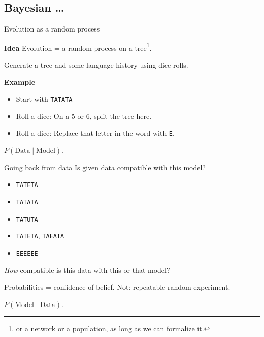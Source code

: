 \documentclass[9pt]{beamer}
\newcommand{\paragraph}[1]{\par{\bfseries #1}}
\begin{document}
\subsection{Bayesian …}
\begin{frame}{Evolution as a random process}
  \paragraph{Idea} Evolution = a random process on a tree\footnote{or a network or
    a population, as long as we can formalize it.}.

  Generate a tree and some language history using dice rolls.

  \pause

  \paragraph{Example}
  \begin{itemize}
  \item Start with \texttt{TATATA}
  \item Roll a dice: On a 5 or 6, split the tree here.
  \item Roll a dice: Replace that letter in the word with \texttt{E}.
  \end{itemize}
  \pause
  $P(\text{Data} \mid \text{Model})$.
\end{frame}
\begin{frame}{Going back from data}
  Is given data compatible with this model?

  \pause
  \begin{itemize}
  \item \texttt{TATETA}
  \pause
  \item \texttt{TATATA}
  \pause
  \item \texttt{TATUTA}
  \pause
  \item \texttt{TATETA}, \texttt{TAEATA}
  \pause
  \item \texttt{EEEEEE}
  \end{itemize}
  \pause

  \emph{How} compatible is this data with this or that model?

  Probabilities = confidence of belief. {\small Not: repeatable random
    experiment}.

  $P(\text{Model} \mid \text{Data})$.
\end{frame}
\end{document}
